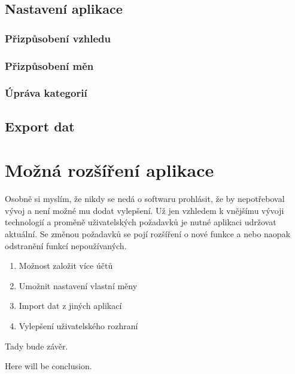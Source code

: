 \documentclass[
  biblatex,
  figures=true,
  tables=false,
  glossaries,
  index
]{kidiplom}
\begin{document}
\subsection{Nastavení aplikace}

\subsubsection{Přizpůsobení vzhledu}

\subsubsection{Přizpůsobení měn}

\subsubsection{Úpráva kategorií}

\subsection{Export dat}


\section{Možná rozšíření aplikace}
Osobně si myslím, že nikdy se nedá o softwaru prohlásit, že by nepotřeboval vývoj a není možné mu dodat vylepšení. Už jen vzhledem k vnějšímu vývoji technologií a proměně uživatelských požadavků je nutné aplikaci udržovat aktuální. Se změnou požadavků se pojí rozšíření o nové funkce a nebo naopak odstranění funkcí nepoužívaných.

\begin{enumerate}
  \item Možnost založit více účtů
  \item Umožnit nastavení vlastní měny
  \item Import dat z jiných aplikací
  \item Vylepšení uživatelského rozhraní
\end{enumerate}

\begin{kiconclusions}
Tady bude závěr.
\end{kiconclusions}

\begin{kiconclusions}[english]
Here will be conclusion.
\end{kiconclusions}

\end{document}
